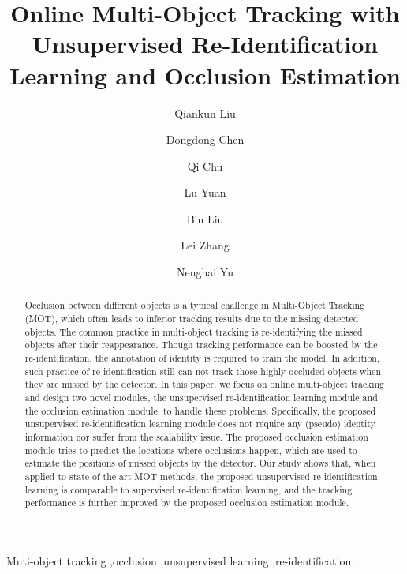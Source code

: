 \documentclass[final,1p,times,twocolumn]{elsarticle}
\begin{document}
	
	\begin{frontmatter}
		




		\title{Online Multi-Object Tracking with Unsupervised Re-Identification Learning and Occlusion Estimation}\author[aff1]{Qiankun Liu}
		\author[aff2]{Dongdong Chen}
		\author[aff1]{Qi Chu}
		\author[aff2]{Lu Yuan}
		\author[aff1]{Bin Liu}
		\author[aff3]{Lei Zhang}
		\author[aff1]{Nenghai Yu}
		
		
		
		\begin{abstract}
			Occlusion between different objects is a typical challenge in Multi-Object Tracking (MOT), which often leads to inferior tracking results due to the missing detected objects. The common practice in multi-object tracking is re-identifying the missed objects after their reappearance. Though tracking performance can be boosted by the re-identification, the annotation of identity is required to train the model. In addition, such practice of re-identification still can not track those highly occluded objects when they are missed by the detector. In this paper, we focus on online multi-object tracking and design two novel modules, the unsupervised re-identification learning module and the occlusion estimation module, to handle these problems. Specifically, the proposed unsupervised re-identification learning module does not require any (pseudo) identity information nor suffer from  the  scalability  issue.
The proposed occlusion estimation module tries to predict the locations where occlusions happen, which are used to estimate the positions of missed objects by the detector. Our study shows that, when applied to state-of-the-art MOT methods, the proposed unsupervised re-identification learning is comparable to supervised re-identification learning, and the tracking performance is further improved by the proposed occlusion estimation module.
			
		\end{abstract}
		
		\begin{keyword}
			Muti-object tracking \sep occlusion \sep unsupervised learning \sep re-identification.

		\end{keyword}
		
	\end{frontmatter}
	
\end{document}
